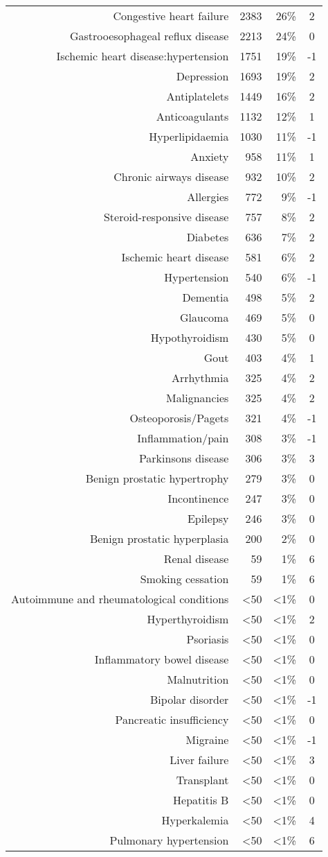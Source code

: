 \documentclass{article}
\begin{document}
\begin{longtable}[c]{@{}rrrc@{}}
Congestive heart failure & 2383 & 26\% & 2 \\
Gastrooesophageal reflux disease & 2213 & 24\% & 0 \\
Ischemic heart disease:hypertension & 1751 & 19\% & -1 \\
Depression & 1693 & 19\% & 2 \\
Antiplatelets & 1449 & 16\% & 2 \\
Anticoagulants & 1132 & 12\% & 1 \\
Hyperlipidaemia & 1030 & 11\% & -1 \\
Anxiety & 958 & 11\% & 1 \\
Chronic airways disease & 932 & 10\% & 2 \\
Allergies & 772 & 9\% & -1 \\
Steroid-responsive disease & 757 & 8\% & 2 \\
Diabetes & 636 & 7\% & 2 \\
Ischemic heart disease & 581 & 6\% & 2 \\
Hypertension & 540 & 6\% & -1 \\
Dementia & 498 & 5\% & 2 \\
Glaucoma & 469 & 5\% & 0 \\
Hypothyroidism & 430 & 5\% & 0 \\
Gout & 403 & 4\% & 1 \\
Arrhythmia & 325 & 4\% & 2 \\
Malignancies & 325 & 4\% & 2 \\
Osteoporosis/Pagets & 321 & 4\% & -1 \\
Inflammation/pain & 308 & 3\% & -1 \\
Parkinsons disease & 306 & 3\% & 3 \\
Benign prostatic hypertrophy & 279 & 3\% & 0 \\
Incontinence & 247 & 3\% & 0 \\
Epilepsy & 246 & 3\% & 0 \\
Benign prostatic hyperplasia & 200 & 2\% & 0 \\
Renal disease & 59 & 1\% & 6 \\
Smoking cessation & 59 & 1\% & 6 \\
Autoimmune and rheumatological conditions & <50 & <1\% & 0 \\
Hyperthyroidism & <50 & <1\% & 2 \\
Psoriasis & <50 & <1\% & 0 \\
Inflammatory bowel disease & <50 & <1\% & 0 \\
Malnutrition & <50 & <1\% & 0 \\
Bipolar disorder & <50 & <1\% & -1 \\
Pancreatic insufficiency & <50 & <1\% & 0 \\
Migraine & <50 & <1\% & -1 \\
Liver failure & <50 & <1\% & 3 \\
Transplant & <50 & <1\% & 0 \\
Hepatitis B & <50 & <1\% & 0 \\
Hyperkalemia & <50 & <1\% & 4 \\
Pulmonary hypertension & <50 & <1\% & 6 \\
\bottomrule
\end{longtable}
\end{document}
